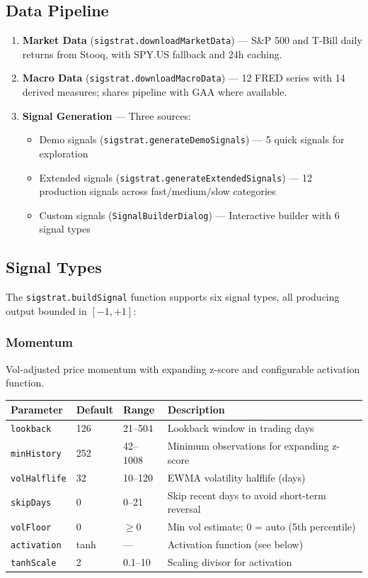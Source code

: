 \documentclass[11pt,a4paper]{article}
\begin{document}
\subsection{Data Pipeline}
\begin{enumerate}[leftmargin=2em]
  \item \textbf{Market Data} (\texttt{sigstrat.downloadMarketData}) --- S\&P 500 and T-Bill daily returns from Stooq, with SPY.US fallback and 24h caching.
  \item \textbf{Macro Data} (\texttt{sigstrat.downloadMacroData}) --- 12 FRED series with 14 derived measures; shares pipeline with GAA where available.
  \item \textbf{Signal Generation} --- Three sources:
  \begin{itemize}
    \item Demo signals (\texttt{sigstrat.generateDemoSignals}) --- 5 quick signals for exploration
    \item Extended signals (\texttt{sigstrat.generateExtendedSignals}) --- 12 production signals across fast/medium/slow categories
    \item Custom signals (\texttt{SignalBuilderDialog}) --- Interactive builder with 6 signal types
  \end{itemize}
\end{enumerate}

\subsection{Signal Types}
The \texttt{sigstrat.buildSignal} function supports six signal types, all producing output bounded in $[-1, +1]$:

\subsubsection{Momentum}
Vol-adjusted price momentum with expanding z-score and configurable activation function.

\begin{center}
\begin{tabularx}{\textwidth}{l l l X}
\toprule
\textbf{Parameter} & \textbf{Default} & \textbf{Range} & \textbf{Description} \\
\midrule
\texttt{lookback} & 126 & 21--504 & Lookback window in trading days \\
\texttt{minHistory} & 252 & 42--1008 & Minimum observations for expanding z-score \\
\texttt{volHalflife} & 32 & 10--120 & EWMA volatility halflife (days) \\
\texttt{skipDays} & 0 & 0--21 & Skip recent days to avoid short-term reversal \\
\texttt{volFloor} & 0 & $\geq 0$ & Min vol estimate; 0 = auto (5th percentile) \\
\texttt{activation} & tanh & --- & Activation function (see below) \\
\texttt{tanhScale} & 2 & 0.1--10 & Scaling divisor for activation \\
\bottomrule
\end{tabularx}
\end{center}
\end{document}
